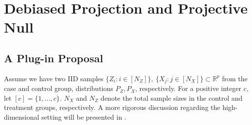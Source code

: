 \documentclass[11pt]{article}
\begin{document}


\section{Debiased Projection and Projective Null}\label{section: debiased}

\subsection{A Plug-in Proposal}\label{section: plug-in test}

Assume we have two IID samples $\{Z_i: i \in [N_Z]\},~\{X_j: j \in [N_X]\}\subset \mathbb{R}^p$ from the case and control group, distributions $P_Z, P_X$, respectively. For a positive integer $c$, let $[c] = \{1,..., c\}$. $N_X$ and $N_Z$ denote the total sample sizes in the control and treatment groups, respectively. A more rigorous discussion regarding the high-dimensional setting will be presented in .
\end{document}
